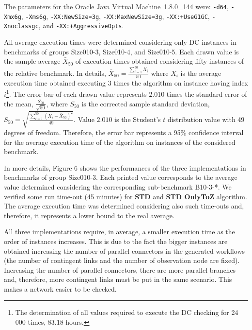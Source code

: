 \documentclass[a4paper,11pt]{article}
\begin{document}
The parameters for the Oracle Java Virtual Machine~1.8.0\_144 were: \texttt{-d64}, \texttt{-Xmx6g}, \texttt{-Xms6g}, \texttt{-XX:NewSize=3g}, \texttt{-XX:MaxNewSize=3g}, \texttt{-XX:+UseG1GC}, \texttt{-Xnoclassgc}, and \texttt{-XX:+AggressiveOpts}. 

All average execution times were determined considering only DC instances in benchmarks of groups Size010-3, Size010-4, and Size010-5.
Each drawn value is the sample average $\bar{X}_{50}$ of execution times obtained considering fifty instances of the relative benchmark. 
In details, $\bar{X}_{50}=\frac{\sum_{i=1}^{50} X_i}{50}$ where $X_i$ is the average execution time obtained executing 3 times the algorithm on instance having index $i$\footnote{The determination of all values required to execute the DC checking for 24 000 times, 83.18 hours.}.
The error bar of each drawn value represents $2.010$ times the standard error of the mean, $\frac{S_{50}}{\sqrt{50}}$, where $S_{50}$ is the corrected sample standard deviation, $S_{50}= \sqrt{\frac{\sum_{i=1}^{50} (X_i-\bar{X}_{50})^2}{49}}$. Value $2.010$ is the Student's $t$ distribution value with 49 degrees of freedom. 
Therefore, the error bar represents a 95\% confidence interval for the average execution time of the algorithm on instances of the considered benchmark.

In more details, Figure 6 shows the performances of the three implementations in benchmarks of group Size010-3. 
Each printed value corresponds to the average value determined considering the corresponding sub-benchmark B10-3-*.
We verified some run time-out (45 minutes) for \textbf{STD} and \textbf{STD OnlyToZ} algorithm. 
The average execution time was determined considering also such time-outs and, therefore, it represents a lower bound to the real average.

All three implementations require, in average, a smaller execution time as the order of instances increases. 
This is due to the fact the bigger instances are obtained increasing the number of parallel connectors in the generated workflows (the number of contingent links and the number of observation node are fixed). Increasing the number of parallel connectors, there are more parallel branches and, therefore, more contingent links must be put in the same scenario.
This makes a network easier to be checked. 
\end{document}
